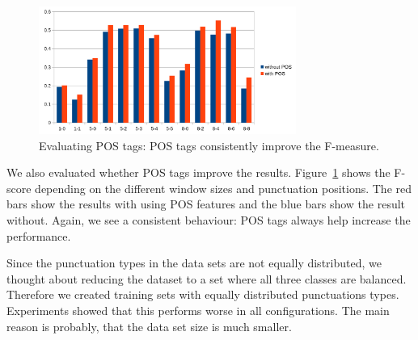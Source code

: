 \begin{figure}[ht]
    \centering
    \includegraphics[width=0.75\textwidth]{img/window_pos_eval.png}
    \caption{Evaluating POS tags: POS tags consistently improve the F-measure.}
    \label{fig:window_pos_eval}
\end{figure}

We also evaluated whether POS tags improve the results.
Figure~\ref{fig:window_pos_eval} shows the F-score depending on the different window sizes and punctuation positions.
The red bars show the results with using POS features and the blue bars show the result without.
Again, we see a consistent behaviour: POS tags always help increase the performance.

Since the punctuation types in the data sets are not equally distributed, we thought about reducing the dataset to a set where all three classes are balanced.
Therefore we created training sets with equally distributed punctuations types.
Experiments showed that this performs worse in all configurations.
The main reason is probably, that the data set size is much smaller.
